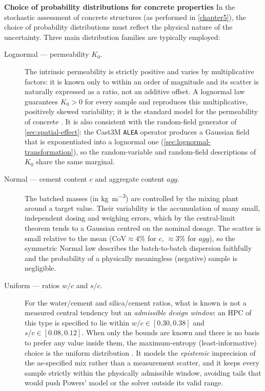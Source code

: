 \textbf{Choice of probability distributions for concrete properties} \label{sec:distribution-justification}
In the stochastic assessment of concrete structures (as performed in \cref{chapter5}), the choice of probability distributions must reflect the physical nature of the uncertainty. Three main distribution families are typically employed:

\begin{description}
    \item[Lognormal --- permeability $K_0$.] The intrinsic permeability is strictly positive and varies by multiplicative factors: it is known only to within an order of magnitude and its scatter is naturally expressed as a ratio, not an additive offset. A lognormal law guarantees $K_0>0$ for every sample and reproduces this multiplicative, positively skewed variability; it is the standard model for the permeability of concrete \cite{delarrard2010,sudret2000}. It is also consistent with the random-field generator of \cref{sec:spatial-effect}: the Cast3M \texttt{ALEA} operator produces a Gaussian field that is exponentiated into a lognormal one (\cref{sec:lognormal-transformation}), so the random-variable and random-field descriptions of $K_0$ share the same marginal.
    
    \item[Normal --- cement content $c$ and aggregate content $agg$.] The batched masses (in \si{\kilogram\per\cubic\meter}) are controlled by the mixing plant around a target value. Their variability is the accumulation of many small, independent dosing and weighing errors, which by the central-limit theorem tends to a Gaussian centred on the nominal dosage. The scatter is small relative to the mean ($\mathrm{CoV}\approx 4\%$ for $c$, $\approx 3\%$ for $agg$), so the symmetric Normal law describes the batch-to-batch dispersion faithfully and the probability of a physically meaningless (negative) sample is negligible.
    
    \item[Uniform --- ratios $w/c$ and $s/c$.] For the water/cement and silica/cement ratios, what is known is not a measured central tendency but an \emph{admissible design window}: an HPC of this type is specified to lie within $w/c\in[0.30,0.38]$ and $s/c\in[0.08,0.12]$. When only the bounds are known and there is no basis to prefer any value inside them, the maximum-entropy (least-informative) choice is the uniform distribution \cite{baroth2023}. It models the \emph{epistemic} imprecision of the as-specified mix rather than a measurement scatter, and it keeps every sample strictly within the physically admissible window, avoiding tails that would push Powers' model or the solver outside its valid range.
\end{description}

